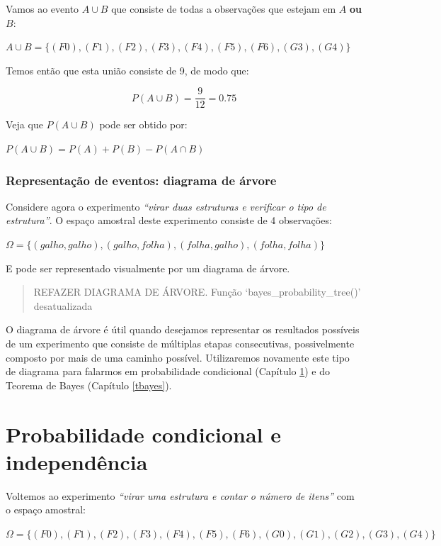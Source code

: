 \documentclass[
]{book}
\begin{document}
Vamos ao evento \(A \cup B\) que consiste de todas a observações que estejam em \(A\) \textbf{ou} \(B\):

\(A \cup B = \{(F0),(F1),(F2),(F3),(F4),(F5),(F6),(G3),(G4) \}\)

Temos então que esta união consiste de 9, de modo que:

\[P(A \cup B) = \frac{9}{12} = 0.75\]

Veja que \(P(A \cup B)\) pode ser obtido por:

\(P(A \cup B) = P(A) + P(B) - P(A \cap B)\)

\hypertarget{representauxe7uxe3o-de-eventos-diagrama-de-uxe1rvore}{%
\subsection{Representação de eventos: diagrama de árvore}\label{representauxe7uxe3o-de-eventos-diagrama-de-uxe1rvore}}

Considere agora o experimento \emph{``virar duas estruturas e verificar o tipo de estrutura''}. O espaço amostral deste experimento consiste de 4 observações:

\(\Omega = \{(galho, galho), (galho, folha), (folha, galho), (folha, folha)\}\)

E pode ser representado visualmente por um diagrama de árvore.

\begin{quote}
REFAZER DIAGRAMA DE ÁRVORE. Função `bayes\_probability\_tree()' desatualizada
\end{quote}

O diagrama de árvore é útil quando desejamos representar os resultados possíveis de um experimento que consiste de múltiplas etapas consecutivas, possivelmente composto por mais de uma caminho possível. Utilizaremos novamente este tipo de diagrama para falarmos em probabilidade condicional (Capítulo \ref{probcondind}) e do Teorema de Bayes (Capítulo \ref{tbayes}).

\hypertarget{probcondind}{%
\chapter{Probabilidade condicional e independência}\label{probcondind}}

Voltemos ao experimento \emph{``virar uma estrutura e contar o número de itens''} com o espaço amostral:

\(\Omega = \{(F0), (F1), (F2), (F3), (F4), (F5), (F6), (G0), (G1), (G2), (G3), (G4)\}\)
\end{document}
